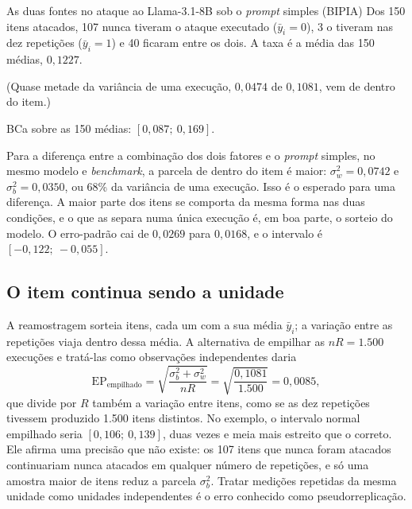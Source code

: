\begin{bloco}{As duas fontes no ataque ao Llama-3.1-8B sob o \textit{prompt} simples (BIPIA)}
Dos 150 itens atacados, 107 nunca tiveram o ataque executado ($\bar y_i = 0$),
3 o tiveram nas dez repetições ($\bar y_i = 1$) e 40 ficaram entre os dois.
A taxa é a média das 150 médias, $0{,}1227$.

(Quase metade da variância de uma execução, $0{,}0474$ de $0{,}1081$, vem de
dentro do item.)


BCa sobre as 150 médias: $[0{,}087;\ 0{,}169]$.
\end{bloco}

Para a diferença entre a combinação dos dois fatores e o \textit{prompt}
simples, no mesmo modelo e \textit{benchmark}, a parcela de dentro do item é
maior: $\sigma_w^2 = 0{,}0742$ e $\sigma_b^2 = 0{,}0350$, ou 68\% da variância
de uma execução. Isso é o esperado para uma diferença. A maior parte dos itens
se comporta da mesma forma nas duas condições, e o que as separa numa única
execução é, em boa parte, o sorteio do modelo. O erro-padrão cai de $0{,}0269$
para $0{,}0168$, e o intervalo é $[-0{,}122;\ -0{,}055]$.

\subsection*{O item continua sendo a unidade}

A reamostragem sorteia itens, cada um com a sua média $\bar y_i$; a variação
entre as repetições viaja dentro dessa média. A alternativa de empilhar as
$nR = 1.500$ execuções e tratá-las como observações independentes daria
\begin{equation}
\mathrm{EP}_{\text{empilhado}} = \sqrt{\frac{\sigma_b^2 + \sigma_w^2}{nR}}
= \sqrt{\frac{0{,}1081}{1.500}} = 0{,}0085,
\end{equation}
que divide por $R$ também a variação entre itens, como se as dez repetições
tivessem produzido 1.500 itens distintos. No exemplo, o intervalo normal
empilhado seria $[0{,}106;\ 0{,}139]$, duas vezes e meia mais estreito que o
correto. Ele afirma uma precisão que não existe: os 107 itens que nunca foram
atacados continuariam nunca atacados em qualquer número de repetições, e só
uma amostra maior de itens reduz a parcela $\sigma_b^2$. Tratar medições
repetidas da mesma unidade como unidades independentes é o erro conhecido
como pseudorreplicação.

